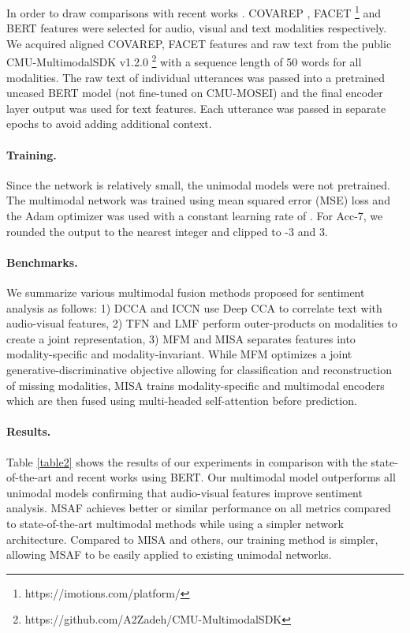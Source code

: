 \documentclass[10pt,twocolumn,letterpaper]{article}
\begin{document}
In order to draw comparisons with recent works \cite{sun2019learning,hazarika2020misa}. COVAREP \cite{coverap}, FACET \footnote{https://imotions.com/platform/} and BERT \cite{devlin2018bert} features were selected for audio, visual and text modalities respectively. We acquired aligned COVAREP, FACET features and raw text from the public CMU-MultimodalSDK v1.2.0 \footnote{https://github.com/A2Zadeh/CMU-MultimodalSDK} with a sequence length of 50 words for all modalities. The raw text of individual utterances was passed into a pretrained uncased BERT model (not fine-tuned on CMU-MOSEI) and the final encoder layer output was used for text features. Each utterance was passed in separate epochs to avoid adding additional context. 

\paragraph{Training.}
Since the network is relatively small, the unimodal models were not pretrained. The multimodal network was trained using mean squared error (MSE) loss and the Adam optimizer was used with a constant learning rate of . For Acc-7, we rounded the output to the nearest integer and clipped to -3 and 3.

\paragraph{Benchmarks.}
We summarize various multimodal fusion methods proposed for sentiment analysis as follows: 1) DCCA \cite{sun2019multimodal} and ICCN \cite{sun2019learning} use Deep CCA to correlate text with audio-visual features, 2) TFN \cite{zadeh2017tfn} and LMF \cite{8752006lmf} perform outer-products on modalities to create a joint representation, 3) MFM \cite{tsai2018learning} and MISA \cite{hazarika2020misa} separates features into modality-specific and modality-invariant. While MFM optimizes a joint generative-discriminative objective allowing for classification and reconstruction of missing modalities, MISA trains modality-specific and multimodal encoders which are then fused using multi-headed self-attention before prediction.

\paragraph{Results.} 
Table \ref{table2} shows the results of our experiments in comparison with the state-of-the-art and recent works using BERT. Our multimodal model outperforms all unimodal models confirming that audio-visual features improve sentiment analysis. MSAF achieves better or similar performance on all metrics compared to state-of-the-art multimodal methods while using a simpler network architecture. Compared to MISA and others, our training method is simpler, allowing MSAF to be easily applied to existing unimodal networks.
\end{document}
